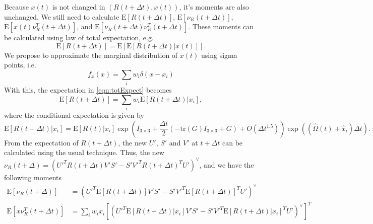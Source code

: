 \documentclass[10pt]{article}
\newcommand{\tr}[1]{\ensuremath{\mathrm{tr}\left( #1 \right)}}
\newcommand{\expect}[1]{\ensuremath{\mathrm{E}\left[ #1 \right]}}
\begin{document}
Because $x(t)$ is not changed in $(R(t+\Delta t),x(t))$, it's moments are also unchanged.
We still need to calculate $\expect{R(t+\Delta t)}$, $\expect{\nu_R(t+\Delta t)}$, $\expect{x(t)\nu_R^T(t+\Delta t)}$, and $\expect{\nu_R(t+\Delta t)\nu_R^T(t+\Delta t)}$.
These moments can be calculated using law of total expectation, e.g.
\begin{equation} \label{eqn:totExpect}
	\expect{R(t+\Delta t)} = \expect{\expect{R(t+\Delta t)\left|\right.x(t)}}.
\end{equation}
We propose to approximate the marginal distribution of $x(t)$ using sigma points, i.e.
\begin{equation}
	f_x(x) = \sum_i w_i\delta(x-x_i)
\end{equation}
With this, the expectation in \eqref{eqn:totExpect} becomes
\begin{equation}
	\expect{R(t+\Delta t)} = \sum_i w_i\expect{R(t+\Delta t)\left|\right. x_i},
\end{equation}
where the conditional expectation is given by
\begin{equation}
	\expect{R(t+\Delta t)|x_i} = \expect{R(t)|x_i}\exp\left(I_{3\times 3}+\frac{\Delta t}{2}(-\tr{G}I_{3\times 3}+G)+O(\Delta t^{1.5})\right)\exp\left((\hat{\Omega}(t)+\hat{x}_i)\Delta t\right).
\end{equation}
From the expectation of $R(t+\Delta t)$, the new $U'$, $S'$ and $V'$ at $t+\Delta t$ can be calculated using the usual technique.
Thus, the new $\nu_R(t+\Delta) = \left(U'^TR(t+\Delta t)V'S'-S'V'^TR(t+\Delta t)^TU'\right)^\vee$, and we have the following moments
\begin{align}
	\expect{\nu_R(t+\Delta)} &= \left( U'^T\expect{R(t+\Delta t)}V'S' - S'V'^T\expect{R(t+\Delta t)}^TU' \right)^\vee \\
	\expect{x\nu_R^T(t+\Delta t)} &= \sum_i w_ix_i\left[\left( U'^T\expect{R(t+\Delta t)|x_i}V'S' - S'V'^T\expect{R(t+\Delta t)|x_i}^TU' \right)^\vee\right]^T
\end{align}
\end{document}
